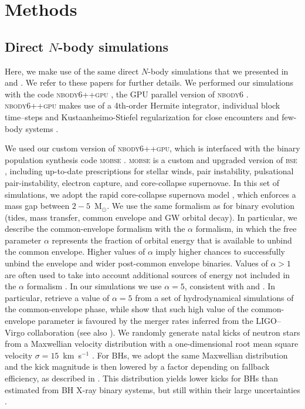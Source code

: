 \documentclass[fleqn,usenatbib]{mnras}
\newcommand{\Ms}{M$_\odot$}
\begin{document}
\section{Methods}
\label{sec:methods}

\subsection{Direct $N$-body simulations}
Here, we make use of the same direct $N$-body simulations that we presented in \citet{Rastello20,rastello2021} and \citet{dicarlo20}. We refer to these papers for further details. 
We performed our simulations with the code \textsc{nbody6++gpu} \citep{wang15}, the GPU parallel version of \textsc{nbody6}
\citep{Aarseth03}. \textsc{nbody6++gpu} makes use of a 4th-order Hermite integrator, individual
block time–steps \citep{makino92} and Kustaanheimo-Stiefel 
regularization for close encounters and few-body systems
\citep{stiefel65}.
 
We used our custom version of \textsc{nbody6++gpu}, which is interfaced with the binary population synthesis code \textsc{mobse} 
\citep{Mapelli17,giacobbo18,giacobbomapelli18}. \textsc{mobse} is a custom and upgraded version of \textsc{bse} \citep{hurley00,hurley02}, including up-to-date
prescriptions for stellar winds, pair instability, pulsational pair-instability, electron capture, and 
 core-collapse supernovae. 
In this set of simulations, we adopt the rapid core-collapse supernova model \citep{fryer12}, which enforces a mass gap between $2-5$~\Ms.
We 
use the same formalism as \cite{hurley02} for binary evolution (tides, mass transfer, common envelope and
GW orbital decay).  
In particular, we describe the common-envelope formalism with the $\alpha{}$ formalism, in which the free parameter 
$\alpha{}$  
represents the fraction of orbital energy that is available to unbind the common envelope.  
Higher values of $\alpha$ imply higher chances to successfully unbind the envelope and wider post-common envelope binaries.
Values of $\alpha{}>1$ are often used to take into account 
additional sources of energy not included in the $\alpha{}$ formalism \citep[e.g.,][]{klencki2021}.
In our simulations we use $\alpha{}=5$, consistent with \cite{giacobbomapelli18} and \cite{fragos2019}. In particular, \cite{fragos2019} retrieve a value of $\alpha=5$ from a set of hydrodynamical simulations of the common-envelope phase, while \cite{giacobbomapelli18} show that such high value of the common-envelope parameter is favoured by the merger rates inferred from the LIGO--Virgo collaboration (see also \citealt{sgalletta2023}).   
We randomly generate natal kicks of neutron stars  
from a Maxwellian velocity distribution with 
a one-dimensional root mean square velocity $\sigma{}=15$~km~s$^{-1}$ \citep{giacobbomapelli18}. 
For BHs, we adopt the same Maxwellian distribution and the kick magnitude is then lowered  by a factor depending on fallback efficiency, 
as described in \cite{fryer12}. This distribution yields lower kicks for BHs than estimated from BH X-ray binary systems, but still within their large uncertainties \citep[e.g.,][]{repetto2012,repetto2017,atri2019}. 
\end{document}
